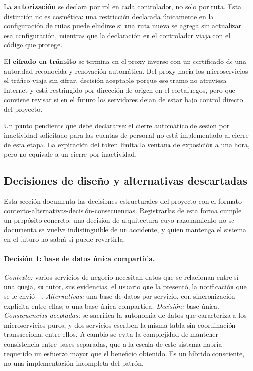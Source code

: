	La \textbf{autorización} se declara por rol en cada controlador, no solo por ruta. Esta
	distinción no es cosmética: una restricción declarada únicamente en la configuración de rutas
	puede eludirse si una ruta nueva se agrega sin actualizar esa configuración, mientras que la
	declaración en el controlador viaja con el código que protege.
	
	El \textbf{cifrado en tránsito} se termina en el proxy inverso con un certificado de una
	autoridad reconocida y renovación automática. Del proxy hacia los microservicios el tráfico
	viaja sin cifrar, decisión aceptable porque ese tramo no atraviesa Internet y está restringido
	por dirección de origen en el cortafuegos, pero que conviene revisar si en el futuro los
	servidores dejan de estar bajo control directo del proyecto.
	
	Un punto pendiente que debe declararse: el cierre automático de sesión por inactividad
	solicitado para las cuentas de personal no está implementado al cierre de esta etapa. La
	expiración del token limita la ventana de exposición a una hora, pero no equivale a un cierre
	por inactividad.
	
	\subsection{Decisiones de diseño y alternativas descartadas}
	\label{sec:decisiones_diseno}
	Esta sección documenta las decisiones estructurales del proyecto con el formato
	contexto-alternativas-decisión-consecuencias. Registrarlas de esta forma cumple un propósito
	concreto: una decisión de arquitectura cuyo razonamiento no se documenta se vuelve
	indistinguible de un accidente, y quien mantenga el sistema en el futuro no sabrá si puede
	revertirla.
	
	\paragraph{Decisión 1: base de datos única compartida.}
	\emph{Contexto:} varios servicios de negocio necesitan datos que se relacionan entre sí ---una
	queja, su tutor, sus evidencias, el usuario que la presentó, la notificación que se le envió---.
	\emph{Alternativas:} una base de datos por servicio, con sincronización explícita entre ellas;
	o una base única compartida. \emph{Decisión:} base única. \emph{Consecuencias aceptadas:} se
	sacrifica la autonomía de datos que caracteriza a los microservicios puros, y dos servicios
	escriben la misma tabla sin coordinación transaccional entre ellos. A cambio se evita la
	complejidad de mantener consistencia entre bases separadas, que a la escala de este sistema
	habría requerido un esfuerzo mayor que el beneficio obtenido. Es un híbrido consciente, no una
	implementación incompleta del patrón.
	
